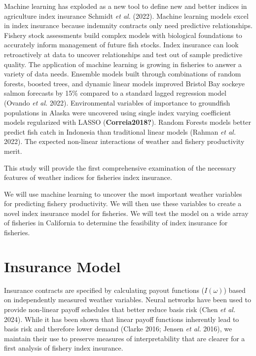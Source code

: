 \documentclass[
  letterpaper,
  DIV=11,
  numbers=noendperiod]{scrartcl}
\begin{document}
Machine learning has exploded as a new tool to define new and better
indices in agriculture index insurance Schmidt \emph{et al.} (2022).
Machine learning models excel in index insurance because indemnity
contracts only need predictive relationships. Fishery stock assessments
build complex models with biological foundations to accurately inform
management of future fish stocks. Index insurance can look retroactively
at data to uncover relationships and test out of sample predictive
quality. The application of machine learning is growing in fisheries to
answer a variety of data needs. Ensemble models built through
combinations of random forests, boosted trees, and dynamic linear models
improved Bristol Bay sockeye salmon forecasts by 15\% compared to a
standard lagged regression model (Ovando \emph{et al.} 2022).
Environmental variables of importance to groundfish populations in
Alaska were uncovered using single index varying coefficient models
regularized with LASSO (\textbf{Correia2018?}). Random Forests models
better predict fish catch in Indonesia than traditional linear models
(Rahman \emph{et al.} 2022). The expected non-linear interactions of
weather and fishery productivity merit.

This study will provide the first comprehensive examination of the
necessary features of weather indices for fisheries index insurance.

We will use machine learning to uncover the most important weather
variables for predicting fishery productivity. We will then use these
variables to create a novel index insurance model for fisheries. We will
test the model on a wide array of fisheries in California to determine
the feasibility of index insurance for fisheries.

\hypertarget{sec-model}{%
\section{Insurance Model}\label{sec-model}}

Insurance contracts are specified by calculating payout functions
(\(I(\omega)\)) based on independently measured weather variables.
Neural networks have been used to provide non-linear payoff schedules
that better reduce basis risk (Chen \emph{et al.} 2024). While it has
been shown that linear payoff functions inherently lead to basis risk
and therefore lower demand (Clarke 2016; Jensen \emph{et al.} 2016), we
maintain their use to preserve measures of interpretability that are
clearer for a first analysis of fishery index insurance.
\end{document}
